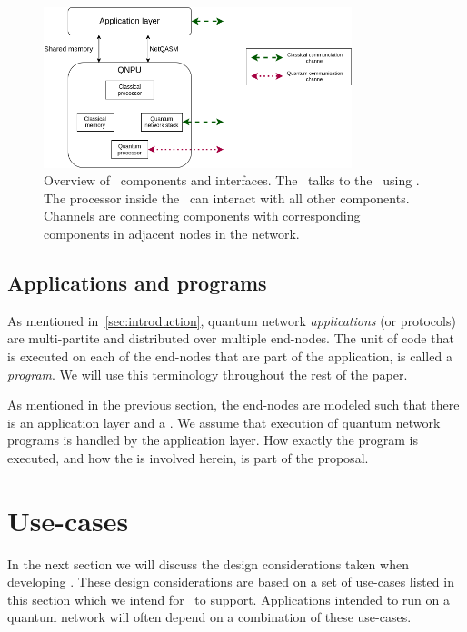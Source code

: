 \begin{figure}
    \centering
    \includegraphics[width=0.8\textwidth]{figures/netqasm/qnpu.png}
    \caption{Overview of \QNPU\ components and interfaces. The \host\ talks to
        the \QNPU\ using \netqasm. The processor inside the \QNPU\ can interact with
        all other components. Channels are connecting components with corresponding
        components in adjacent nodes in the network.}
    \label{fig:qnpu}
\end{figure}



\subsection{Applications and programs}
As mentioned in~\cref{sec:introduction}, quantum network \textit{applications} (or protocols) are multi-partite and distributed over multiple end-nodes.
The unit of code that is executed on each of the end-nodes that are part of the application, is called a \textit{program}.
We will use this terminology throughout the rest of the paper.

As mentioned in the previous section, the end-nodes are modeled such that there is an application layer and a \QNPU. We assume that execution of quantum network programs is handled by the application layer.
How exactly the program is executed, and how the \QNPU is involved herein, is part of the \netqasm proposal.


\section{Use-cases}
\label{sec:use_cases}
In the next section we will discuss the design considerations taken when developing \netqasm.
These design considerations are based on a set of use-cases listed in this section which we intend for \netqasm\ to support.
Applications intended to run on a quantum network will often depend on a combination of these use-cases.

